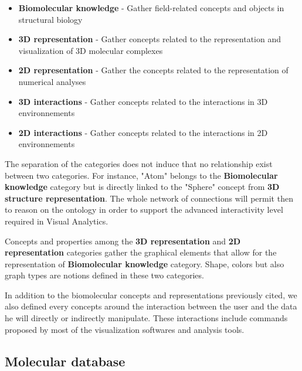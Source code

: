 \documentclass{vgtc}                          %
\begin{document}
\begin{itemize}
  \item \textbf{Biomolecular knowledge} - Gather field-related concepts and objects in structural biology 
  \item \textbf{3D representation} - Gather concepts related to the representation and visualization of 3D molecular complexes
  \item \textbf{2D representation} - Gather the concepts related to the representation of numerical analyses 
  \item \textbf{3D interactions} - Gather concepts related to the interactions in 3D environnements
  \item \textbf{2D interactions} - Gather concepts related to the interactions in 2D environnements
\end{itemize}

The separation of the categories does not induce that no relationship exist between two categories. For instance, "Atom" belongs to the \textbf{Biomolecular knowledge} category but is directly linked to the "Sphere" concept from \textbf{3D structure representation}. The whole network of connections will permit then to reason on the ontology in order to support the advanced interactivity level required in Visual Analytics.

Concepts and properties among the \textbf{3D representation} and \textbf{2D representation} categories gather the graphical elements that allow for the representation of \textbf{Biomolecular knowledge} category. Shape, colors but also graph types are notions defined in these two categories. 

In addition to the biomolecular concepts and representations previously cited, we also defined every concepts around the interaction between the user and the data he will directly or indirectly manipulate. These interactions include commands proposed by most of the visualization softwares and analysis tools.

\subsection{Molecular database}
\end{document}

